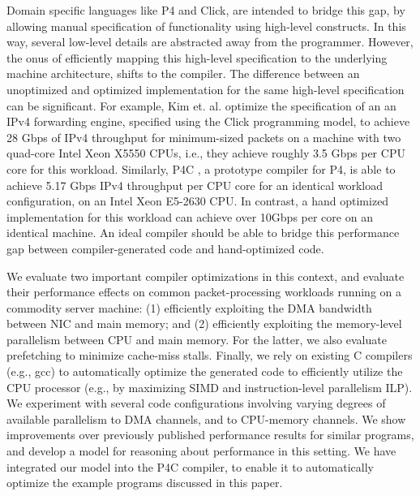 Domain specific languages like P4\cite{Bosshart:2014:PPP:2656877.2656890} and Click\cite{kohler2000click}, are intended
to bridge this gap, by allowing manual specification of functionality using high-level constructs. In this way, several
low-level details are abstracted away from the programmer. However, the onus of efficiently mapping this high-level
specification to the underlying machine architecture, shifts to the compiler. The difference between an unoptimized
and optimized implementation for the same high-level specification can be significant.
For example, Kim et. al. \cite{Kim:2012:PBC:2349896.2349910} optimize the specification of an
an IPv4 forwarding engine, specified using the Click programming model, to achieve 28 Gbps of IPv4 throughput for minimum-sized
packets
on a machine with two quad-core Intel Xeon X5550 CPUs, i.e., they achieve roughly 3.5 Gbps per CPU core for this workload.
Similarly, P4C \cite{Laki:2016:HSP:2934872.2959080}, a prototype compiler for P4,
is able to achieve 5.17 Gbps IPv4 throughput per CPU core for an identical workload configuration, on an Intel Xeon E5-2630
CPU. In contrast, a hand optimized implementation for this workload can achieve over 10Gbps per core on an
identical machine. An ideal compiler should be able to
bridge this performance gap between compiler-generated code and hand-optimized code.

We evaluate two important compiler optimizations in this context, and evaluate their performance
effects on common packet-processing workloads running on a commodity server machine: (1) efficiently exploiting
the DMA bandwidth between NIC and main memory; and (2) efficiently exploiting the memory-level
parallelism between CPU and main memory. For the latter, we also evaluate prefetching to minimize
cache-miss stalls. Finally, we rely on existing C compilers (e.g., gcc) to automatically optimize
the generated code to efficiently utilize the CPU processor (e.g., by maximizing SIMD
and instruction-level parallelism ILP). We experiment with several code configurations involving varying
degrees of available parallelism to DMA channels, and to CPU-memory channels. We show
improvements over previously published performance results for similar programs, and develop a model
for reasoning about performance in this setting. We have integrated our model into the
P4C compiler, to enable it to
automatically optimize the example programs discussed in this paper.


